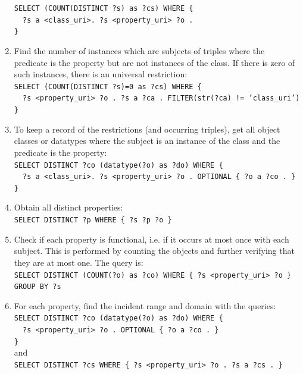 \documentclass[review]{elsarticle}
\newcommand{\textttt}[1] {\texttt{\footnotesize#1}}
\newcommand{\h} {\hphantom ~ }
\begin{document}
\begin{enumerate}[leftmargin=0cm]
	\textttt{SELECT (COUNT(DISTINCT ?s) as ?cs) WHERE \{\\
	\h ?s a <class\_uri>. ?s <property\_uri> ?o .\\ \}}
\item Find the number of instances which are subjects of triples where the predicate is the property but are not instances of the class.
	If there is zero of such instances, there is an universal restriction:\\
	\textttt{SELECT (COUNT(DISTINCT ?s)=0 as ?cs) WHERE \{\\
	\h ?s <property\_uri> ?o . ?s a ?ca . FILTER(str(?ca) != 'class\_uri')\\ \}}
\item To keep a record of the restrictions (and occurring triples), get all object classes or datatypes where the subject is an instance of the class and the predicate is the property:\\
	\textttt{SELECT DISTINCT ?co (datatype(?o) as ?do) WHERE \{\\
		\h ?s a <class\_uri>. ?s <property\_uri> ?o . OPTIONAL \{ ?o a ?co . \}\\
\}}
    \item Obtain all distinct properties:\\
        \textttt{SELECT DISTINCT ?p WHERE \{ ?s ?p ?o \}}
    \item Check if each property is functional, i.e. if it
        occurs at most once with each subject.
        This is performed by counting the objects and further verifying
        that they are at most one. The query is:\\
        \textttt{SELECT DISTINCT (COUNT(?o) as ?co) WHERE \{ ?s
            <property\_uri> ?o \} GROUP BY ?s}
    \item For each property, find the incident range and domain with the
        queries:\\
        \textttt{SELECT DISTINCT ?co (datatype(?o) as ?do) WHERE \{\\
			\h ?s <property\_uri> ?o . OPTIONAL \{ ?o a ?co . \}\\\}} \\
        and \\
        \textttt{SELECT DISTINCT ?cs WHERE \{ ?s <property\_uri> ?o . ?s a ?cs . \}}

\end{enumerate}
\end{document}
